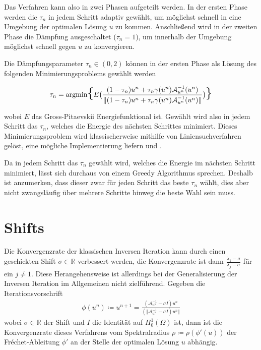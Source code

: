 \documentclass[final,bibliography=totocnumbered]{include/seminar}
\newcommand{\mR}{\ensuremath{\mathbb{R}}}
\newcommand{\Honez}{\ensuremath{{H^1_0(\Omega)}}}
\newcommand{\mA}{\ensuremath{\mathcal{A}}}
\newcommand{\mAi}{\ensuremath{\mathcal{A}}^{-1}}
\newcommand{\GPEnergy}{Gross-Pitaevskii Energiefunktional}
\theoremstyle{break}
\begin{document}
\medskip

Das Verfahren kann also in zwei Phasen aufgeteilt werden.
In der ersten Phase werden die $\tau_n$ in jedem Schritt adaptiv gewählt,
um möglichst schnell in eine Umgebung der optimalen Lösung $u$ zu kommen.
Anschließend wird in der zweiten Phase die Dämpfung
ausgeschaltet ($\tau_n = 1$), um
innerhalb der Umgebung möglichst schnell gegen $u$ zu konvergieren.

\medskip

Die Dämpfungsparameter $\tau_n \in (0, 2)$ können in der ersten Phase als Lösung des
folgenden Minimierungsproblems gewählt werden

\begin{align*}
    \tau_n = \mathrm{arg min}
    \mathlarger{\mathlarger{\mathlarger{\{}}}
    E\big(\frac{(1 - \tau_n)u^n + \tau_n\gamma(u^n)\mA_{u^n}^{-1}(u^n)}
    {\Vert(1 - \tau_n)u^n + \tau_n\gamma(u^n)\mA_{u^n}^{-1}(u^n)\Vert}\big)
    \mathlarger{\mathlarger{\mathlarger{\}}}}
\end{align*}

wobei $E$ das {\GPEnergy} ist. Gewählt wird also in jedem Schritt
das $\tau_n$, welches die Energie des nächsten Schrittes minimiert.
Dieses Minimierungsproblem wird klassischerweise mithilfe von Liniensuchverfahren
gelöst, eine mögliche Implementierung liefern \cite{flow} und \cite{flow_min}.

\medskip

Da in jedem Schritt das $\tau_n$ gewählt wird, welches die Energie im
nächsten Schritt minimiert,
lässt sich durchaus von einem Greedy Algorithmus sprechen.
Deshalb ist anzumerken, dass dieser zwar für jeden Schritt das beste $\tau_n$
wählt, dies aber nicht zwangsläufig über mehrere Schritte hinweg die beste
Wahl sein muss.

\section{Shifts}

Die Konvergenzrate der klassischen Inversen Iteration kann durch einen geschickten
Shift $\sigma \in \mR$ verbessert werden, die Konvergenzrate ist dann
$\frac{\lambda_1 - \sigma}{\lambda_j - \sigma}$ für ein $j \neq 1$.
Diese Herangehensweise ist allerdings bei der Generalisierung der Inversen
Iteration im Allgemeinen nicht zielführend.
Gegeben die Iterationsvorschrift
\begin{align}
    \phi(u^n) \coloneq u^{n+1} = \frac{(\mAi_{u^n} - \sigma I)u^n}{(\Vert\mAi_{u^n} - \sigma I)u^n\Vert}
\end{align}
wobei $\sigma \in \mR$ der Shift und $I$ die Identität auf $\Honez$ ist,
dann ist die Konvergenzrate dieses Verfahrens vom Spektralradius $\rho \coloneq \rho(\phi'(u))$
der Fréchet-Ableitung $\phi'$ an der Stelle der optimalen Lösung $u$ abhängig.
\end{document}
